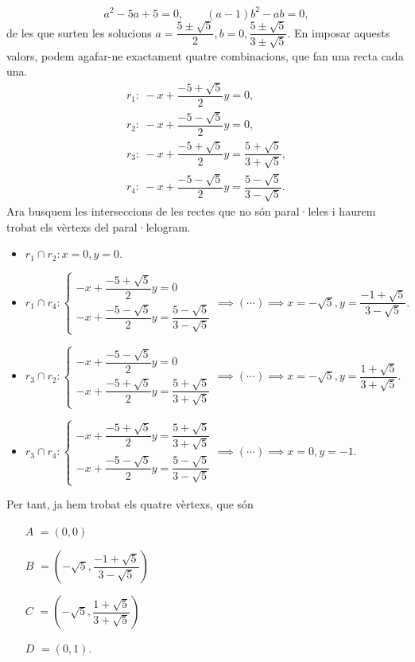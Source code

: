 \documentclass[11pt]{article}
\begin{document}
\[
a^2-5a+5=0,\qquad (a-1)b^2-ab=0,
\]
de les que surten les solucions $a=\dfrac{5\pm\sqrt{5}}{2},b=0,\dfrac{5\pm\sqrt{5}}{3\pm\sqrt{5}}.$ En imposar aquests valors, podem agafar-ne exactament quatre combinacions, que fan una recta cada una.
\[
\begin{aligned}
r_1:\ -x+\dfrac{-5+\sqrt{5}}{2}y=0,\\
r_2:\ -x+\dfrac{-5-\sqrt{5}}{2}y=0,\\
r_3:\ -x+\dfrac{-5+\sqrt{5}}{2}y=\dfrac{5+\sqrt{5}}{3+\sqrt{5}},\\
r_4:\ -x+\dfrac{-5-\sqrt{5}}{2}y=\dfrac{5-\sqrt{5}}{3-\sqrt{5}}.
\end{aligned}
\]
Ara busquem les interseccions de les rectes que no són paral·leles i haurem trobat els vèrtexs del paral·lelogram.
\begin{itemize}
	\item $r_1\cap r_2:x=0,y=0.$
	\item $r_1\cap r_4:\begin{cases}
	-x+\dfrac{-5+\sqrt{5}}{2}y=0\\
	-x+\dfrac{-5-\sqrt{5}}{2}y=\dfrac{5-\sqrt{5}}{3-\sqrt{5}}
	\end{cases}\implies(\cdots)\implies x=-\sqrt{5},y=\dfrac{-1+\sqrt{5}}{3-\sqrt{5}}.$
	\item $r_3\cap r_2:\begin{cases}
	-x+\dfrac{-5-\sqrt{5}}{2}y=0\\
	-x+\dfrac{-5+\sqrt{5}}{2}y=\dfrac{5+\sqrt{5}}{3+\sqrt{5}}
	\end{cases}\implies(\cdots)\implies x=-\sqrt{5},y=\dfrac{1+\sqrt{5}}{3+\sqrt{5}}.$
	\item $r_3\cap r_4:\begin{cases}
	-x+\dfrac{-5+\sqrt{5}}{2}y=\dfrac{5+\sqrt{5}}{3+\sqrt{5}}\\
	-x+\dfrac{-5-\sqrt{5}}{2}y=\dfrac{5-\sqrt{5}}{3-\sqrt{5}}
	\end{cases}\implies(\cdots)\implies x=0,y=-1.$
\end{itemize}
Per tant, ja hem trobat els quatre vèrtexs, que són
\begin{itemize}
	\item[$A$]$=(0,0)$
	\item[$B$]$=(-\sqrt{5},\dfrac{-1+\sqrt{5}}{3-\sqrt{5}})$
	\item[$C$]$=(-\sqrt{5},\dfrac{1+\sqrt{5}}{3+\sqrt{5}})$
	\item[$D$]$=(0,1).$
\end{itemize}
\newpage
\end{document}
